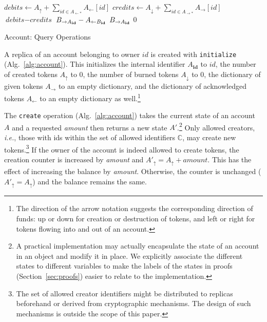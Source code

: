 \documentclass[9pt]{article}   	%
\begin{document}
\begin{algorithm}
\begin{algorithmic}[1]
    \State
        \State $\textit{debits} \leftarrow A_\uparrow + \sum\limits_{id \in A_{\leftarrow *}} A_{\leftarrow}[id]$ 
        \State $\textit{credits} \leftarrow A_\downarrow + \sum\limits_{id \in A_{\rightarrow *}} A_{\rightarrow}[id]$
        \State \Return $\textit{debits} - \textit{credits}$
    \EndFunction
    \State
        		\State \Return $B_{\rightarrow A_{\tiny\textbf{id}}} - A_{\leftarrow B_{\tiny\textbf{id}}}$
		\State \Return $B_{\rightarrow A_{\tiny\textbf{id}}}$
	\Else
		\State \Return $0$
	\EndIf
    \EndFunction
    \end{algorithmic}
\caption{\label{alg:query} Account: Query Operations}
\end{algorithm}

A replica of an account belonging to owner $id$ is created with \texttt{initialize} (Alg.~\ref{alg:account}). This initializes the internal identifier $A_{\textbf{id}}$ to $id$, the number of created tokens $A_\uparrow$ to $0$, the number of burned tokens $A_\downarrow$ to $0$, the dictionary of given tokens $A_\rightarrow$ to an empty dictionary, and the dictionary of acknowledged tokens $A_\leftarrow$ to an empty dictionary as well.\footnote{The direction of the arrow notation suggests the corresponding direction of funds: up or down for creation or destruction of tokens, and  left or right for tokens flowing into and out of an account.}

The \texttt{create} operation (Alg.~\ref{alg:account}) takes the current state of an account $A$ and a requested \textit{amount} then returns a new state $A'$.\footnote{A practical implementation may actually encapsulate the state of an account in an object and modify it in place. We explicitly associate the different states to different variables to make the labels of the states in proofs (Section~\ref{sec:proofs}) easier to relate to the implementation.} Only allowed creators, \textit{i.e.}, those with ids within the set of allowed identifiers $\mathds{C}$, may create new tokens.\footnote{The set of allowed creator identifiers might be distributed to replicas beforehand or derived from cryptographic mechanisms. The design of such mechanisms is outside the scope of this paper.} If the owner of the account is indeed allowed to create tokens, the creation counter is increased by \textit{amount} and $A'_\uparrow = A_\uparrow + \textit{amount}$. This has the effect of increasing the balance by \textit{amount}. Otherwise, the counter is unchanged ($A'_\uparrow=A_\uparrow$) and the balance remains the same.
\end{document}

